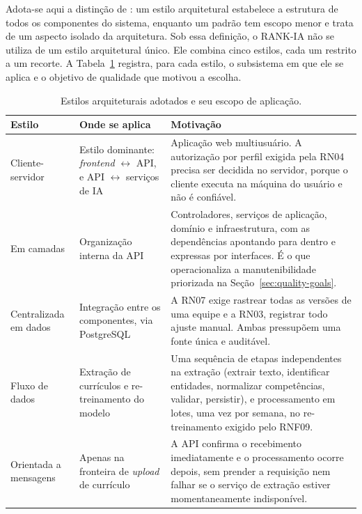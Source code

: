 \documentclass[a4paper,12pt,oneside,openany]{book}
\begin{document}
Adota-se aqui a distinção de \citet{pressman2021}: um estilo arquitetural
estabelece a estrutura de todos os componentes do sistema, enquanto um padrão
tem escopo menor e trata de um aspecto isolado da arquitetura. Sob essa
definição, o RANK-IA não se utiliza de um estilo arquitetural único. Ele 
combina cinco estilos, cada um restrito a um recorte. A Tabela~\ref{tab:estilos-adotados} 
registra, para cada estilo, o subsistema em que ele se aplica e o objetivo 
de qualidade que motivou a escolha.

\begin{table}[H]
\centering
\small
\caption{Estilos arquiteturais adotados e seu escopo de aplicação.}
\label{tab:estilos-adotados}
\begin{tabularx}{0.97\textwidth}{p{} p{} X}
\toprule
\textbf{Estilo} & \textbf{Onde se aplica} & \textbf{Motivação} \\
\midrule
Cliente-servidor & Estilo dominante: \textit{frontend} $\leftrightarrow$ API, e
API $\leftrightarrow$ serviços de IA & Aplicação web multiusuário. A
autorização por perfil exigida pela RN04 precisa ser decidida no servidor,
porque o cliente executa na máquina do usuário e não é confiável. \\
Em camadas & Organização interna da API & Controladores, serviços de
aplicação, domínio e infraestrutura, com as dependências apontando para
dentro e expressas por interfaces. É o que operacionaliza a manutenibilidade
priorizada na Seção~\ref{sec:quality-goals}. \\
Centralizada em dados & Integração entre os componentes, via PostgreSQL &
A RN07 exige rastrear todas as versões de uma equipe e a RN03, registrar todo
ajuste manual. Ambas pressupõem uma fonte única e auditável. \\
Fluxo de dados & Extração de currículos e re-treinamento do modelo &
Uma sequência de etapas independentes na extração (extrair texto,
identificar entidades, normalizar competências, validar, persistir), e
processamento em lotes, uma vez por semana, no re-treinamento exigido pelo
RNF09. \\
Orientada a mensagens & Apenas na fronteira de \textit{upload} de currículo &
A API confirma o recebimento imediatamente e o
processamento ocorre depois, sem prender a requisição nem falhar se o serviço
de extração estiver momentaneamente indisponível. \\
\bottomrule
\end{tabularx}
\end{table}
\end{document}
